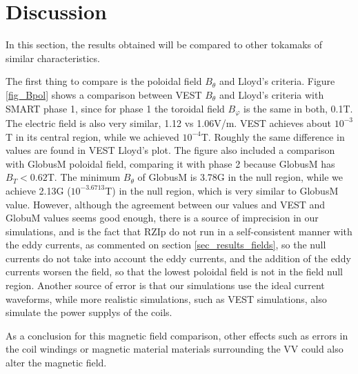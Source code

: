 \documentclass[a4paper,12pt,oneside]{book}
\begin{document}
\section{Discussion}

In this section, the results obtained will be compared to other tokamaks of similar characteristics.

The first thing to compare is the poloidal field $B_\theta$ and Lloyd's criteria. Figure \ref{fig_Bpol} shows a comparison between VEST $B_\theta$ and Lloyd's criteria with SMART phase 1, since for phase 1 the toroidal field $B_\varphi$ is the same in both, 0.1T. The electric field is also very similar, 1.12 vs 1.06V/m. VEST achieves about $10^{-3}$T in its central region, while we achieved $10^{-4}$T. Roughly the same difference in values are found in VEST Lloyd's plot. The figure also included a comparison with GlobusM poloidal field, comparing it with phase 2 because GlobusM has $B_T<0.62$T. The minimum $B_\theta$ of GlobusM is 3.78G in the null region, while we achieve 2.13G ($10^{-3.6713}$T) in the null region, which is very similar to GlobusM value. However, although the agreement between our values and VEST and GlobuM values seems good enough, there is a source of imprecision in our simulations, and is the fact that RZIp do not run in a self-consistent manner with the eddy currents, as commented on section \ref{sec_results_fields}, so the null currents do not take into account the eddy currents, and the addition of the eddy currents worsen the field, so that the lowest poloidal field is not in the field null region. Another source of error is that our simulations use the ideal current waveforms, while more realistic simulations, such as VEST simulations, also simulate the power supplys of the coils.

As a conclusion for this magnetic field comparison, other effects such as errors in the coil windings or magnetic material materials surrounding the VV could also alter the magnetic field.
 
\end{document}
